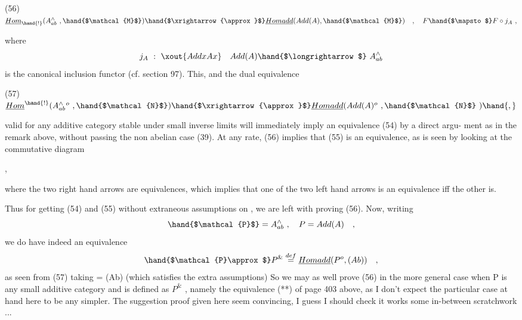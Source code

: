 
(56) \qquad $\underline{Hom}_{\hand{!}}(A^{\wedge}_{ab}\ ,\hand{$\mathcal{M}$})\hand{$\xrightarrow{\approx}$}\underline{Homadd}(Add(A),\hand{$\mathcal{M}$})\quad ,\quad F\hand{$\mapsto$} F\circ j_A\ ,$

where
\[ j_A\ :\ \xout{AddxAx}\quad Add(A)\hand{$\longrightarrow$}\ A^{\wedge}_{ab} \]
is the canonical inclusion functor (cf. section 97). This, and the
dual equivalence 

(57) \qquad $\underline{Hom}^{\hand{!}}(A^{\wedge\ o}_{ab}\ ,\hand{$\mathcal{N}$})\hand{$\xrightarrow{\approx}$}\underline{Homadd}(Add(A)^o\ ,\hand{$\mathcal{N}$}\ )\hand{,}$

valid for any additive category stable under small inverse limits\hand{,} \hand{,} will immediately imply an equivalence (54) by a direct argu-%
ment\hand{,}  as in the remark above, without passing
  the non abelian case (39). At any rate, (56) implies that (55) is an
equivalence, as is seen by looking at the commutative diagram

\quad ,

where the two right hand arrows are equivalences, which implies that
one of the two left hand arrows is an equivalence iff the other is.

Thus for getting (54) and (55) without extraneous assumptions on ,
we are left with proving (56). Now, writing
\[ \hand{$\mathcal{P}$}= A^{\wedge}_{ab}\ ,\quad P = Add(A)\quad , \]
we do have indeed an equivalence
\[ \hand{$\mathcal{P}\approx$} P^{\&} \overset{def}{=} \underline{Homadd}(P^o,(Ab))\quad , \]
as seen from (57) taking = (Ab) (which satisfies the extra assumptions)
So we may as well prove (56) in the more general case when P is any small
additive category and  is defined as $P^{\&}$ , namely  the equivalence (**)
of page 403 above, as I don't expect the particular case at hand here to
be any simpler. The suggestion  proof given here seem convincing, I
guess I should check it works   some in-between scratchwork ...

